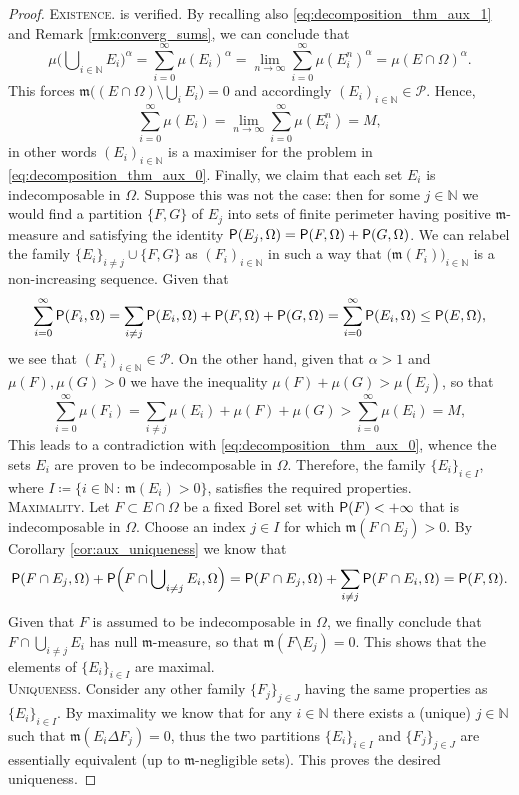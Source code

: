 \documentclass[reqno]{amsart}
\numberwithin{equation}{section}
\newcommand{\N}{\mathbb{N}}
\newcommand{\mm}{\mathfrak m}
\newcommand{\1}{\mathbbm 1}
\renewcommand{\P}{{\sf P}}
\begin{document}
\begin{proof} {\color{blue}\textsc{Existence.}}
is verified. By recalling also \eqref{eq:decomposition_thm_aux_1} and Remark
\ref{rmk:converg_sums}, we can conclude that
\[
\mu\Big(\bigcup\nolimits_{i\in\N}E_i\Big)^\alpha=\sum_{i=0}^\infty\mu(E_i)^\alpha
=\lim_{n\to\infty}\sum_{i=0}^\infty\mu(E^n_i)^\alpha=\mu(E\cap\Omega)^\alpha.
\]
This forces \(\mm\big((E\cap\Omega)\setminus\bigcup_i E_i\big)=0\) and
accordingly \((E_i)_{i\in\N}\in\mathcal P\). Hence,
\begin{equation}\label{eq:decomposition_thm_aux_3}
\sum_{i=0}^\infty\mu(E_i)=\lim_{n\to\infty}\sum_{i=0}^\infty\mu(E^n_i)=M,
\end{equation}
in other words \((E_i)_{i\in\N}\) is a maximiser for the problem in
\eqref{eq:decomposition_thm_aux_0}. Finally, we claim that each set \(E_i\)
is indecomposable in \(\Omega\). Suppose this was not the case: then for some
\(j\in\N\) we would find a partition \(\{F,G\}\) of \(E_j\) into sets of finite
perimeter having positive \(\mm\)-measure and satisfying the identity
\(\P(E_j,\Omega)=\P(F,\Omega)+\P(G,\Omega)\). We can relabel the family
\(\{E_i\}_{i\neq j}\cup\{F,G\}\) as \((F_i)_{i\in\N}\) in such a way
that \(\big(\mm(F_i)\big)_{i\in\N}\) is a non-increasing sequence. Given that
\[
\sum_{i=0}^\infty\P(F_i,\Omega)
=\sum_{i\neq j}\P(E_i,\Omega)+\P(F,\Omega)+\P(G,\Omega)
=\sum_{i=0}^\infty\P(E_i,\Omega)\leq\P(E,\Omega),
\]
we see that \((F_i)_{i\in\N}\in\mathcal P\). On the other hand, given that
\(\alpha>1\) and \(\mu(F),\mu(G)>0\) we have the inequality \(\mu(F)+\mu(G)>\mu(E_j)\),
so that
\[
\sum_{i=0}^\infty\mu(F_i)=\sum_{i\neq j}\mu(E_i)+\mu(F)+\mu(G)
>\sum_{i=0}^\infty\mu(E_i)=M,
\]
This leads to a contradiction with \eqref{eq:decomposition_thm_aux_0},
whence the sets \(E_i\) are proven to be indecomposable in \(\Omega\).
Therefore, the family \(\{E_i\}_{i\in I}\), where
\(I\coloneqq\big\{i\in\N\,:\,\mm(E_i)>0\big\}\), satisfies the required properties.\\
{\color{blue}\textsc{Maximality.}} Let \(F\subset E\cap\Omega\) be a
fixed Borel set with \(\P(F)<+\infty\) that is indecomposable in \(\Omega\).
Choose an index \(j\in I\) for which \(\mm(F\cap E_j)>0\). By Corollary
\ref{cor:aux_uniqueness} we know that
\[
\P(F\cap E_j,\Omega)+\P\Big(F\cap\bigcup\nolimits_{i\neq j}E_i,\Omega\Big)
=\P(F\cap E_j,\Omega)+\sum_{i\neq j}\P(F\cap E_i,\Omega)=\P(F,\Omega).
\]
Given that \(F\) is assumed to be indecomposable in \(\Omega\), we finally conclude
that \(F\cap\bigcup_{i\neq j}E_i\) has null \(\mm\)-measure, so that
\(\mm(F\setminus E_j)=0\). This shows that the elements of \(\{E_i\}_{i\in I}\)
are maximal.\\
{\color{blue}\textsc{Uniqueness.}} Consider any other family \(\{F_j\}_{j\in J}\)
having the same properties as \(\{E_i\}_{i\in I}\). By maximality we know that
for any \(i\in\N\) there exists a (unique) \(j\in\N\) such that \(\mm(E_i\Delta F_j)=0\),
thus the two partitions \(\{E_i\}_{i\in I}\) and \(\{F_j\}_{j\in J}\) are
essentially equivalent (up to \(\mm\)-negligible sets). This proves the
desired uniqueness.
\end{proof}
\end{document}
